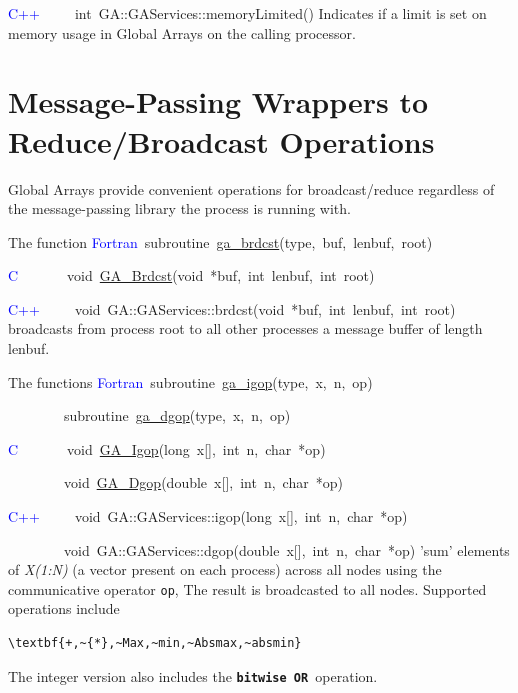 \textcolor{blue}{C++}~~~~~int~GA::GAServices::memoryLimited()
Indicates if a limit is set on memory usage in Global Arrays on the
calling processor. 


\section{Message-Passing Wrappers to Reduce/Broadcast Operations }

Global Arrays provide convenient operations for broadcast/reduce regardless
of the message-passing library the process is running with.

The function
\textcolor{blue}{Fortran}~subroutine~\href{http://www.emsl.pnl.gov/docs/global/ga_ops.html\#ga_brdcst}{ga\_{}brdcst}(type,~buf,~lenbuf,~root)~

\textcolor{blue}{C}~~~~~~~void~\href{http://www.emsl.pnl.gov/docs/global/c_nga_ops.html\#ga_brdcst}{GA\_{}Brdcst}(void~{*}buf,~int~lenbuf,~int~root)~

\textcolor{blue}{C++}~~~~~void~GA::GAServices::brdcst(void~{*}buf,~int~lenbuf,~int~root)
broadcasts from process root to all other processes a message buffer
of length lenbuf.

The functions
\textcolor{blue}{Fortran}~subroutine~\href{http://www.emsl.pnl.gov/docs/global/ga_ops.html\#ga_igop}{ga\_{}igop}(type,~x,~n,~op)~

~~~~~~~~subroutine~\href{http://www.emsl.pnl.gov/docs/global/ga_ops.html\#ga_igop}{ga\_{}dgop}(type,~x,~n,~op)~

\textcolor{blue}{C}~~~~~~~void~\href{http://www.emsl.pnl.gov/docs/global/c_nga_ops.html\#ga_igop}{GA\_{}Igop}(long~x{[}{]},~int~n,~char~{*}op)~

~~~~~~~~void~\href{http://www.emsl.pnl.gov/docs/global/c_nga_ops.html\#ga_dgop}{GA\_{}Dgop}(double~x{[}{]},~int~n,~char~{*}op)~

\textcolor{blue}{C++}~~~~~void~GA::GAServices::igop(long~x{[}{]},~int~n,~char~{*}op)~

~~~~~~~~void~GA::GAServices::dgop(double~x{[}{]},~int~n,~char~{*}op)
'sum' elements of \emph{X(1:N)} (a vector present on each process)
across all nodes using the communicative operator \texttt{op}, The
result is broadcasted to all nodes. Supported operations include
\begin{verbatim}
\textbf{+,~{*},~Max,~min,~Absmax,~absmin}
\end{verbatim}
The integer version also includes the \texttt{\textbf{bitwise OR }}operation.

